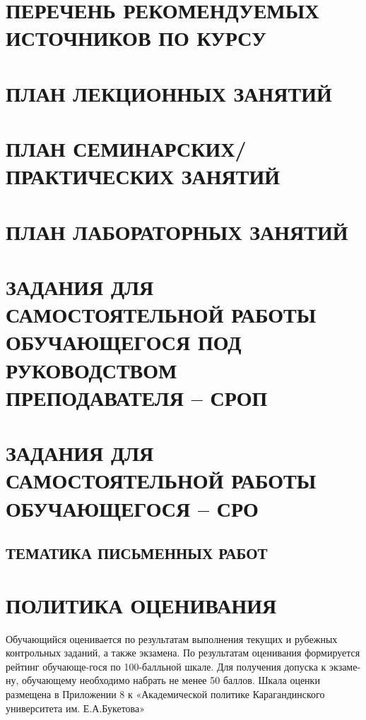 \section{ПЕРЕЧЕНЬ РЕКОМЕНДУЕМЫХ ИСТОЧНИКОВ ПО КУРСУ}
\justifying
\blAlText

\section{ПЛАН ЛЕКЦИОННЫХ ЗАНЯТИЙ}
\justifying
\lssLpsText

\section{ПЛАН СЕМИНАРСКИХ/ ПРАКТИЧЕСКИХ ЗАНЯТИЙ }
\justifying
\splpText

\section{ПЛАН ЛАБОРАТОРНЫХ ЗАНЯТИЙ}
\justifying
\labText

\section{ЗАДАНИЯ ДЛЯ САМОСТОЯТЕЛЬНОЙ РАБОТЫ ОБУЧАЮЩЕГОСЯ ПОД РУКОВОДСТВОМ ПРЕПОДАВАТЕЛЯ – СРОП}
\justifying
\sropText

\section{ЗАДАНИЯ ДЛЯ САМОСТОЯТЕЛЬНОЙ РАБОТЫ ОБУЧАЮЩЕГОСЯ – СРО}
\justifying
\sroText

\subsection{ТЕМАТИКА ПИСЬМЕННЫХ РАБОТ}
\justifying
\pwsText

\section{ПОЛИТИКА ОЦЕНИВАНИЯ}
\justifying
Обучающийся оценивается по результатам выполнения текущих и рубежных контрольных заданий, а также экзамена. По результатам оценивания формируется рейтинг обучающе-гося по 100-балльной шкале. Для получения допуска к экзаме-ну, обучающему необходимо набрать не менее 50 баллов. Шкала оценки размещена в Приложении 8 к «Академической политике Карагандинского университета им. Е.А.Букетова»
\gpText

